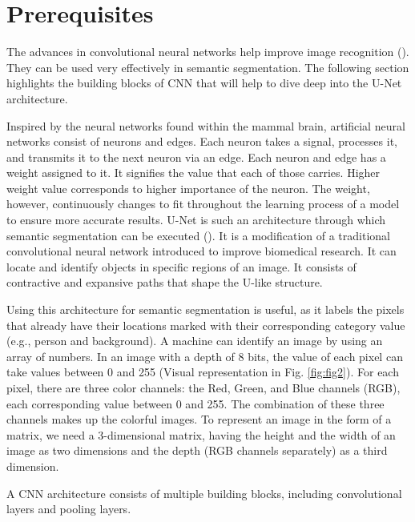 \documentclass[english]{sbrt}
\begin{document}
\section{Prerequisites}
The advances in convolutional neural networks help improve image recognition (\cite{long_2015_fully}). They can be used very effectively in semantic segmentation. The following section highlights the building blocks of CNN that will help to dive deep into the U-Net architecture. 

\par Inspired by the neural networks found within the mammal brain, artificial neural networks consist of neurons and edges. Each neuron takes a signal, processes it, and transmits it to the next neuron via an edge. Each neuron and edge has a weight assigned to it. It signifies the value that each of those carries. Higher weight value corresponds to higher importance of the neuron. The weight, however, continuously changes to fit throughout the learning process of a model to ensure more accurate results. U-Net is such an architecture through which semantic segmentation can be executed (\cite{zhang_2019_unet}). It is a modification of a traditional convolutional neural network introduced to improve biomedical research. It can locate and identify objects in specific regions of an image. It consists of contractive and expansive paths that shape the U-like structure. 


Using this architecture for semantic segmentation is useful, as it labels the pixels that already have their locations marked with their corresponding category value (e.g., person and background). 
A machine can identify an image by using an array of numbers. In an image with a depth of 8 bits, the value of each pixel can take values between 0 and 255 (Visual representation in Fig. \ref{fig:fig2}). For each pixel, there are three color channels: the Red, Green, and Blue channels (RGB), each corresponding value between 0 and 255. The combination of these three channels makes up the colorful images. To represent an image in the form of a matrix, we need a 3-dimensional matrix, having the height and the width of an image as two dimensions and the depth (RGB channels separately) as a third dimension. 


A CNN architecture consists of multiple building blocks, including convolutional layers and pooling layers.  
\end{document}
